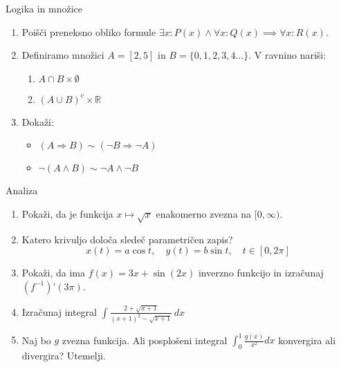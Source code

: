 \begin{frame}{Logika in množice}
	\begin{enumerate}
		\item
		Poišči preneksno obliko formule $\exists x \colon P(x) \land \forall x \colon Q(x) \implies \forall x\colon R(x)$.
		\item 
		Definiramo množici $A = [2, 5]$ in $B = \{0,1,2,3,4\dots\}$.
		V ravnino nariši:
		\begin{enumerate}
		   \item $A\cap B \times \emptyset$
		   \item $(A \cup B)^c \times \mathbb{R}$
		\end{enumerate}
		\item
		Dokaži:
		\begin{itemize}
			\item $(A \Rightarrow B) \sim (\lnot B \Rightarrow \lnot A)$
			\item $\lnot (A \wedge B) \sim \lnot A \land \lnot B$
		\end{itemize}
	\end{enumerate}
\end{frame}

\begin{frame}{Analiza}
	\begin{enumerate}
		\item
		Pokaži, da je funkcija $x \mapsto \sqrt{x}$ enakomerno zvezna na $[0,\infty)$.
		\item 
		Katero krivuljo določa sledeč parametričen zapis?
		$$
		   x(t) = a \cos t, \quad %
		   y(t) = b \sin t, \quad %
		   t \in [0, 2 \pi]
		$$ 
		\item
		Pokaži, da ima $f(x) = 3x + \sin{\left( 2x \right)}$ inverzno funkcijo in izračunaj $(f^{-1})\textrm{'}(3\pi)$.
		
		\item
		Izračunaj integral 
		$\displaystyle \int \frac{2 + \sqrt{x+1}}{(x+1)^2 - \sqrt{x+1}} \, dx$
		\item 
		Naj bo $g$ zvezna funkcija. Ali posplošeni integral 
		$\int_{0}^{1} \frac{g(x)}{x^2}dx$
		konvergira ali divergira? Utemelji.
	\end{enumerate}
\end{frame}

